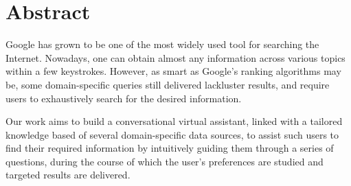 \documentclass[a4paper,12pt,oneside]{report}
\begin{document}



\newpage

\chapter*{Abstract}
Google has grown to be one of the most widely used tool for searching the Internet. Nowadays, one can obtain almost any information across various topics within a few keystrokes. However, as smart as Google's ranking algorithms may be, some domain-specific queries still delivered lackluster results, and require users to exhaustively search for the desired information.

Our work aims to build a conversational virtual assistant, linked with a tailored knowledge based of several domain-specific data sources, to assist such users to find their required information by intuitively guiding them through a series of questions, during the course of which the user's preferences are studied and targeted results are delivered.


\newpage
\renewcommand{\contentsname}{Table of contents}
\tableofcontents

\newpage

\renewcommand{\chaptername}{Chapter}







\renewcommand{\bibname}{References}


\end{document}
